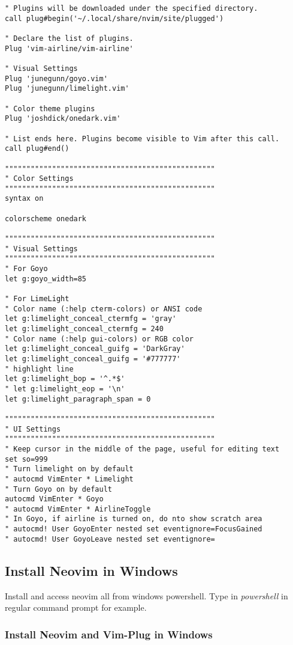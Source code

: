\documentclass[]{article}
\begin{document}
\begin{verbatim}
" Plugins will be downloaded under the specified directory.
call plug#begin('~/.local/share/nvim/site/plugged')

" Declare the list of plugins.
Plug 'vim-airline/vim-airline'

" Visual Settings
Plug 'junegunn/goyo.vim'
Plug 'junegunn/limelight.vim'

" Color theme plugins
Plug 'joshdick/onedark.vim'

" List ends here. Plugins become visible to Vim after this call.
call plug#end()

"""""""""""""""""""""""""""""""""""""""""""""""""
" Color Settings
"""""""""""""""""""""""""""""""""""""""""""""""""
syntax on

colorscheme onedark

"""""""""""""""""""""""""""""""""""""""""""""""""
" Visual Settings
"""""""""""""""""""""""""""""""""""""""""""""""""
" For Goyo
let g:goyo_width=85

" For LimeLight
" Color name (:help cterm-colors) or ANSI code
let g:limelight_conceal_ctermfg = 'gray'
let g:limelight_conceal_ctermfg = 240
" Color name (:help gui-colors) or RGB color
let g:limelight_conceal_guifg = 'DarkGray'
let g:limelight_conceal_guifg = '#777777'
" highlight line
let g:limelight_bop = '^.*$'
" let g:limelight_eop = '\n'
let g:limelight_paragraph_span = 0

"""""""""""""""""""""""""""""""""""""""""""""""""
" UI Settings
"""""""""""""""""""""""""""""""""""""""""""""""""
" Keep cursor in the middle of the page, useful for editing text
set so=999
" Turn limelight on by default
" autocmd VimEnter * Limelight
" Turn Goyo on by default
autocmd VimEnter * Goyo
" autocmd VimEnter * AirlineToggle
" In Goyo, if airline is turned on, do nto show scratch area
" autocmd! User GoyoEnter nested set eventignore=FocusGained
" autocmd! User GoyoLeave nested set eventignore=
\end{verbatim}

\hypertarget{install-neovim-in-windows}{%
\subsection{Install Neovim in Windows}\label{install-neovim-in-windows}}

Install and access neovim all from windows powershell. Type in
\emph{powershell} in regular command prompt for example.

\hypertarget{install-neovim-and-vim-plug-in-windows}{%
\subsubsection{Install Neovim and Vim-Plug in
Windows}\label{install-neovim-and-vim-plug-in-windows}}
\end{document}
